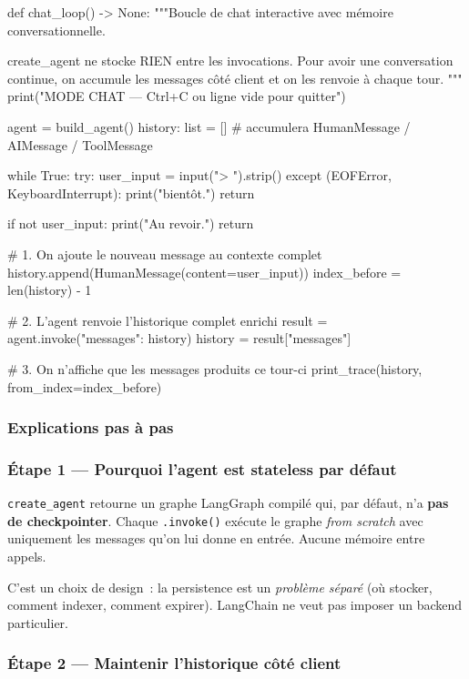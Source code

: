 \documentclass[11pt,a4paper]{article}
\begin{document}
\begin{pythoncode}
def chat_loop() -> None:
    """Boucle de chat interactive avec mémoire conversationnelle.

    create_agent ne stocke RIEN entre les invocations. Pour avoir une
    conversation continue, on accumule les messages côté client et on les
    renvoie à chaque tour.
    """
    print("MODE CHAT — Ctrl+C ou ligne vide pour quitter")

    agent = build_agent()
    history: list = []   # accumulera HumanMessage / AIMessage / ToolMessage

    while True:
        try:
            user_input = input("\n> ").strip()
        except (EOFError, KeyboardInterrupt):
            print(" bientôt.")
            return

        if not user_input:
            print("Au revoir.")
            return

        # 1. On ajoute le nouveau message au contexte complet
        history.append(HumanMessage(content=user_input))
        index_before = len(history) - 1

        # 2. L'agent renvoie l'historique complet enrichi
        result  = agent.invoke({"messages": history})
        history = result["messages"]

        # 3. On n'affiche que les messages produits ce tour-ci
        print_trace(history, from_index=index_before)
\end{pythoncode}

\subsubsection{Explications pas à pas}

\subsubsection*{Étape 1 — Pourquoi l'agent est stateless par défaut}

\texttt{create\_agent} retourne un graphe LangGraph compilé qui, par
défaut, n'a \textbf{pas de checkpointer}. Chaque \texttt{.invoke()}
exécute le graphe \emph{from scratch} avec uniquement les messages
qu'on lui donne en entrée. Aucune mémoire entre appels.

C'est un choix de design~: la persistence est un \emph{problème
séparé} (où stocker, comment indexer, comment expirer). LangChain ne
veut pas imposer un backend particulier.

\subsubsection*{Étape 2 — Maintenir l'historique côté client}
\end{document}
